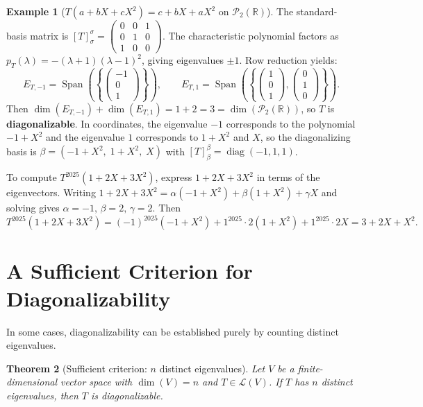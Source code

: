 \documentclass[11pt, a4paper, notitlepage]{report}
\newtheorem{theorem}{Theorem}[section]
\theoremstyle{definition}
\newtheorem{example}[theorem]{Example}
\theoremstyle{remark}
\begin{document}
\begin{example}[$T(a+bX+cX^2) = c + bX + aX^2$ on $\mathscr{P}_2(\mathbb{R})$]
\label{ex:diag-poly-reversal}
The standard-basis matrix is $[T]_\sigma^\sigma = \begin{pmatrix}0&0&1\\0&1&0\\1&0&0\end{pmatrix}$.
The characteristic polynomial factors as
$p_T(\lambda) = -(\lambda+1)(\lambda-1)^2$, giving eigenvalues $\pm 1$.
Row reduction yields:
\[
  E_{T,-1} = \operatorname{Span}\!\left(\left\{\begin{pmatrix}-1\\0\\1\end{pmatrix}\right\}\right),
  \qquad
  E_{T,1} = \operatorname{Span}\!\left(\left\{\begin{pmatrix}1\\0\\1\end{pmatrix},\begin{pmatrix}0\\1\\0\end{pmatrix}\right\}\right).
\]
Then $\dim(E_{T,-1}) + \dim(E_{T,1}) = 1 + 2 = 3 = \dim(\mathscr{P}_2(\mathbb{R}))$, so $T$ is
\textbf{diagonalizable}. In coordinates, the eigenvalue $-1$ corresponds to the polynomial
$-1 + X^2$ and the eigenvalue $1$ corresponds to $1 + X^2$ and $X$, so the diagonalizing
basis is $\beta = (-1+X^2,\; 1+X^2,\; X)$ with
$[T]_\beta^\beta = \operatorname{diag}(-1, 1, 1)$.

To compute $T^{2025}(1+2X+3X^2)$, express $1+2X+3X^2$ in terms of the eigenvectors.
Writing $1+2X+3X^2 = \alpha(-1+X^2) + \beta(1+X^2) + \gamma X$ and solving gives
$\alpha = -1,\, \beta = 2,\, \gamma = 2$. Then
\[
  T^{2025}(1+2X+3X^2)
  = (-1)^{2025}(-1+X^2) + 1^{2025}\cdot 2(1+X^2) + 1^{2025}\cdot 2X
  = 3 + 2X + X^2.
\]
\end{example}

\section{A Sufficient Criterion for Diagonalizability}
\label{sec:diag-sufficient}

In some cases, diagonalizability can be established purely by counting distinct eigenvalues.

\begin{theorem}[Sufficient criterion: $n$ distinct eigenvalues]
\label{thm:diag-distinct-eigenvalues}
Let $V$ be a finite-dimensional vector space with $\dim(V) = n$ and $T \in \mathcal{L}(V)$.
If $T$ has $n$ distinct eigenvalues, then $T$ is diagonalizable.
\end{theorem}
\end{document}
